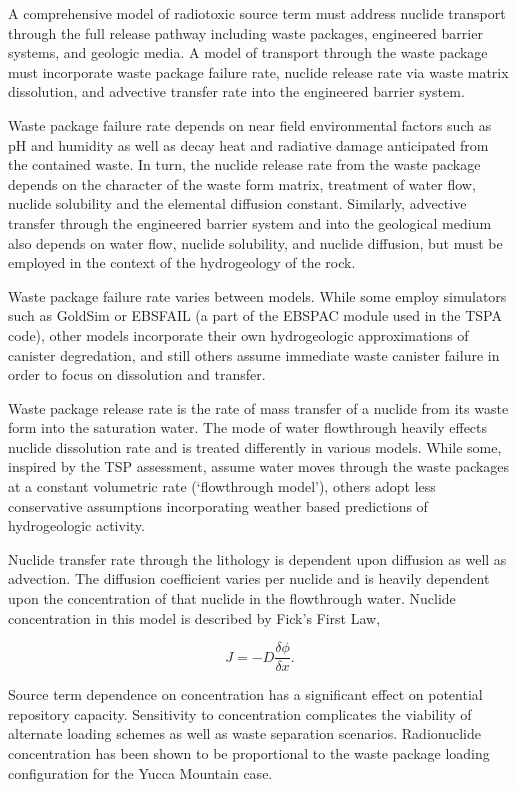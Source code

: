 A comprehensive model of radiotoxic source term must address nuclide transport
through the full release pathway including waste packages, engineered barrier
systems, and geologic media. A model of transport through the waste package
must incorporate waste package failure rate, nuclide release rate via waste
matrix dissolution, and advective transfer rate into the engineered barrier
system.  

Waste package failure rate depends on near field environmental factors such as
pH and humidity as well as decay heat and radiative damage anticipated from the
contained waste.  In turn, the nuclide release rate from the waste package
depends on the character of the waste form matrix, treatment of water flow,
nuclide solubility and the elemental diffusion constant.  Similarly, advective
transfer through the engineered barrier system and into the geological medium
also depends on water flow, nuclide solubility, and nuclide diffusion, but must
be employed in the context of the hydrogeology of the rock.   

Waste package failure rate varies between models. While some employ simulators
such as GoldSim or EBSFAIL (a part of the EBSPAC module used in the TSPA
code), other models incorporate their own hydrogeologic approximations of
canister degredation, and still others assume immediate waste canister failure
in order to focus on dissolution and transfer. 

Waste package release rate is the rate of mass transfer of a nuclide from its
waste form into the saturation water. The mode of water flowthrough heavily
effects nuclide dissolution rate and is treated differently in various models.
While some, inspired by the TSP assessment, assume water moves through the
waste packages at a constant volumetric rate (`flowthrough model'), others
adopt less conservative assumptions incorporating weather based predictions of
hydrogeologic activity.

Nuclide transfer rate through the lithology is  dependent upon diffusion as
well as advection.  The diffusion coefficient varies per nuclide and is heavily
dependent upon the concentration of that nuclide in the flowthrough water.
Nuclide concentration in this model is described by Fick's First Law, 

\begin{equation} 
  J = -D\frac{\delta\phi}{\delta x}.  
\end{equation}

Source term dependence on concentration has a significant effect on potential
repository capacity. Sensitivity to concentration complicates the viability of
alternate loading schemes as well as waste separation scenarios. Radionuclide
concentration has been shown to be proportional to the waste package loading
configuration for the Yucca Mountain
case.\cite{ahn_relationship_2002,kawasaki_congruent_2004}

